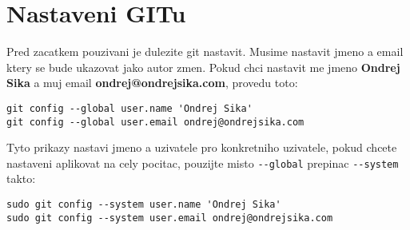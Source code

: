 \section{Nastaveni GITu}

Pred zacatkem pouzivani je dulezite git nastavit. Musime nastavit jmeno a email ktery se bude ukazovat jako autor zmen. Pokud chci nastavit me jmeno {\bf Ondrej Sika} a muj email {\bf ondrej@ondrejsika.com}, provedu toto:

\begin{lstlisting}
git config --global user.name 'Ondrej Sika'
git config --global user.email ondrej@ondrejsika.com
\end{lstlisting}

Tyto prikazy nastavi jmeno a uzivatele pro konkretniho uzivatele, pokud chcete nastaveni aplikovat na cely pocitac, pouzijte misto \lstinline|--global| prepinac \lstinline|--system| takto:

\begin{lstlisting}
sudo git config --system user.name 'Ondrej Sika'
sudo git config --system user.email ondrej@ondrejsika.com
\end{lstlisting}

